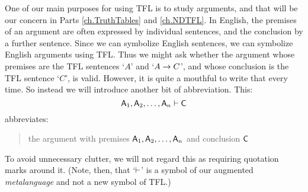 One of our main purposes for using TFL is to study arguments, and that will be our concern in Parts \ref{ch.TruthTables} and \ref{ch.NDTFL}. In English, the premises of an argument are often expressed by individual sentences, and the conclusion by a further sentence. Since we can symbolize English sentences, we can symbolize English arguments using TFL. Thus we might ask whether the argument whose premises are the TFL sentences `$A$' and `$A \rightarrow C$', and whose conclusion is the TFL sentence `$C$', is valid. However, it is quite a mouthful to write that every time. So instead we will introduce another bit of abbreviation. This:
	$$\mathsf{A}_1, \mathsf{A}_2, \ldots, \mathsf{A}_n \vdash \mathsf{C}$$
abbreviates:
	\begin{quote}
		the argument with premises $\mathsf{A}_1, \mathsf{A}_2, \ldots, \mathsf{A}_n$ and conclusion $\mathsf{C}$
	\end{quote}
To avoid unnecessary clutter, we will not regard this as requiring quotation marks around it. (Note, then, that `$\vdash$' is a symbol of our augmented \emph{metalanguage} and not a new symbol of TFL.)
